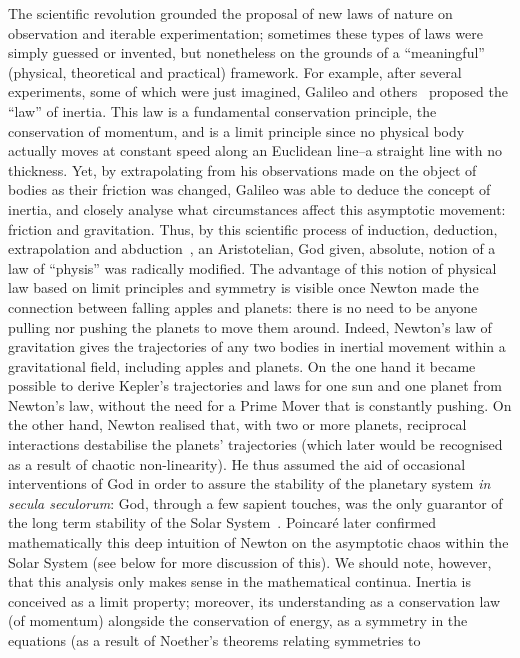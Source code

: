 \documentclass[12pt]{article}
\begin{document}
The scientific revolution grounded the proposal of new laws of nature on observation and iterable experimentation;
sometimes these types of laws were simply
guessed or invented, but nonetheless on the grounds of a ``meaningful'' (physical, theoretical and practical) framework.
For example,
after several experiments, some of which were just imagined,
Galileo and others~\cite{Drake-on-Galilei} proposed the ``law'' of inertia.
This law is a fundamental conservation principle, the conservation of momentum, and is a limit principle since no
physical body actually moves at constant speed along an Euclidean line--a straight line with no thickness.
Yet, by extrapolating from his observations made on the object of bodies as their friction was changed, Galileo was able to
deduce the concept of inertia, and closely analyse what circumstances affect this asymptotic movement: friction and
gravitation.
Thus, by this scientific process of
induction,
deduction, extrapolation
and abduction~\cite{Peirce-cp,sep-abduction,AbductiveInference},
an Aristotelian, God given, absolute, notion of a law of ``physis'' was radically modified.
The advantage of this notion of physical law based on limit principles and symmetry is visible once Newton made the
connection between falling apples and planets: there is no need to be anyone pulling nor pushing the planets   to move them around.
Indeed, Newton's law of gravitation gives the trajectories of any two bodies in inertial movement within a gravitational
field, including apples and planets.
On the one hand it became possible to derive Kepler's trajectories and laws for one sun and one planet from
Newton's law, without the need for a Prime Mover that is constantly pushing.
On the other hand, Newton realised that, with two or more planets, reciprocal interactions destabilise the planets'
trajectories (which later would be recognised as a result of chaotic non-linearity).
He thus assumed the aid of occasional interventions of God in order to assure the stability of the planetary system
\emph{in secula seculorum}: God, through a few sapient touches, was  the only guarantor of the long term
stability of the Solar System~\cite{laskar1994}.
Poincar\'e later confirmed mathematically this deep intuition of Newton on the asymptotic chaos within the Solar
System (see below for more discussion of this).
We should note, however, that this analysis only makes sense in the mathematical continua.
Inertia is conceived as a limit property; moreover, its understanding as a conservation law (of momentum) alongside the
conservation of energy, as a symmetry in the equations (as a result of Noether's theorems relating symmetries to
\end{document}
